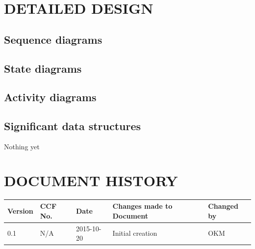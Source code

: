 \documentclass[10pt]{project}
\begin{document}
\section{DETAILED DESIGN}
\subsection{Sequence diagrams}
\subsection{State diagrams}
\subsection{Activity diagrams}
\subsection{Significant data structures}

\clearpage
{}
\begin{thebibliography}{5}
 Nothing yet
\end{thebibliography}
\clearpage

\section*{DOCUMENT HISTORY}
\begin{tabular}{|l | l | l | l | l |}
\hline
Version & CCF No. & Date & Changes made to Document & Changed by \\
\hline
0.1 & N/A & 2015-10-20 & Initial creation & OKM \\
\hline
\end{tabular}
\label{thelastpage}
\end{document}
